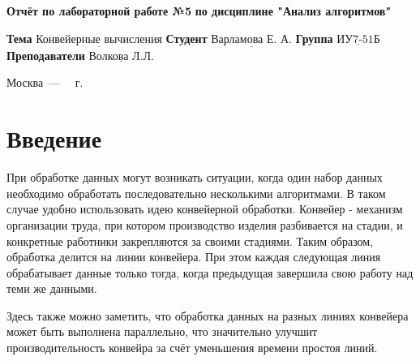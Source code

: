 \documentclass[12pt]{report}
\begin{document}
\begin{titlepage}
	
	\begin{center}
		\noindent\begin{minipage}{1.3\textwidth}\centering
			\Large\textbf{  Отчёт по лабораторной работе №5}\newline
			\textbf{по дисциплине "Анализ алгоритмов"}\newline\newline
		\end{minipage}
	\end{center}
	
	\noindent\textbf{Тема} $\underline{\text{Конвейерные вычисления}}$\newline\newline
	\noindent\textbf{Студент} $\underline{\text{Варламова Е. А.}}$\newline\newline
	\noindent\textbf{Группа} $\underline{\text{ИУ7-51Б}}$\newline\newline
	\noindent\textbf{Преподаватели} $\underline{\text{Волкова Л.Л.}}$\newline\newline\newline
	
	\begin{center}
		\vfill
		Москва~---~\the\year
		~г.
	\end{center}
\end{titlepage}


\tableofcontents

\newpage
\chapter*{Введение}

При обработке данных могут возникать ситуации, когда один набор данных необходимо обработать последовательно несколькими алгоритмами. В таком случае удобно использовать идею конвейерной обработки. Конвейер - механизм организации труда, при котором производство изделия разбивается на стадии, и конкретные работники закрепляются за своими стадиями. Таким образом, обработка делится на линии конвейера. При этом каждая следующая линия обрабатывает данные только тогда, когда предыдущая завершила свою работу над теми же данными. 

Здесь также можно заметить, что обработка данных на разных линиях конвейера может быть выполнена параллельно, что значительно улучшит производительность конвейра за счёт уменьшения времени простоя линий.
\end{document}
